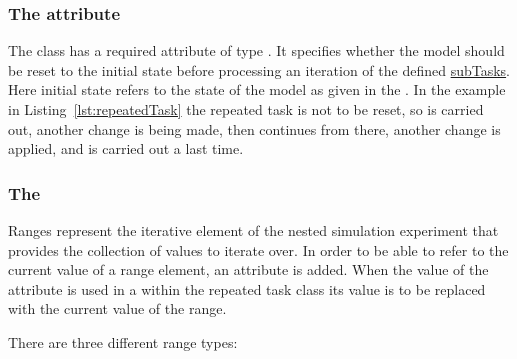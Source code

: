 \subsubsection{The  attribute}
\label{sec:resetModel}
The  class has a required attribute  of type . It specifies whether the model should be reset to the initial state before processing an iteration of the defined \hyperref[class:subTasks]{subTasks}. Here initial state refers to the state of the model as given in the .  In the example in  Listing~\ref{lst:repeatedTask} the repeated task is not to be reset, so  is carried out, another change is being made, then  continues from there, another change is applied, and  is carried out a last time.

\subsubsection{The }
\label{class:ranges}
Ranges represent the iterative element of the nested simulation experiment that provides the collection of values to iterate over. In order to be able to refer to the current value of a range element, an  attribute is added. When the value of the  attribute is used in a  within the repeated task class its value is to be replaced with the current value of the range.

There are three different range types: 

